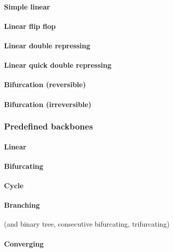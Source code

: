 \paragraph{Simple linear}

\paragraph{Linear flip flop}

\paragraph{Linear double repressing}

\paragraph{Linear quick double repressing}

\paragraph{Bifurcation (reversible)}

\paragraph{Bifurcation (irreversible)}

\subsubsection{Predefined backbones}

\paragraph{Linear}
\paragraph{Bifurcating}
\paragraph{Cycle}
\paragraph{Branching} (and binary tree, consecutive bifurcating, trifurcating)
\paragraph{Converging}
